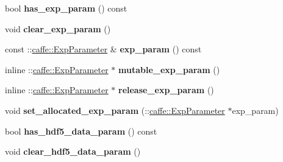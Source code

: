 \begin{DoxyCompactItemize}
\mbox{\label{classcaffe_1_1_v1_layer_parameter_a578cecc6ab3c9c779b070fd3b4bd4d47}} 
bool {\bfseries has\+\_\+exp\+\_\+param} () const
\item 
\mbox{\label{classcaffe_1_1_v1_layer_parameter_a50e536df42170253b5101efae046b4ea}} 
void {\bfseries clear\+\_\+exp\+\_\+param} ()
\item 
\mbox{\label{classcaffe_1_1_v1_layer_parameter_a88ff986d8dc315867eba82260f535112}} 
const \+::\mbox{\hyperlink{classcaffe_1_1_exp_parameter}{caffe\+::\+Exp\+Parameter}} \& {\bfseries exp\+\_\+param} () const
\item 
\mbox{\label{classcaffe_1_1_v1_layer_parameter_a2d54988cbb7a1fc351f5ce5f970fe0bb}} 
inline \+::\mbox{\hyperlink{classcaffe_1_1_exp_parameter}{caffe\+::\+Exp\+Parameter}} $\ast$ {\bfseries mutable\+\_\+exp\+\_\+param} ()
\item 
\mbox{\label{classcaffe_1_1_v1_layer_parameter_a6d368f68fdd78b6d7120eafa0b40583c}} 
inline \+::\mbox{\hyperlink{classcaffe_1_1_exp_parameter}{caffe\+::\+Exp\+Parameter}} $\ast$ {\bfseries release\+\_\+exp\+\_\+param} ()
\item 
\mbox{\label{classcaffe_1_1_v1_layer_parameter_a3ad5cc072e37a3c1e684590c9c67552a}} 
void {\bfseries set\+\_\+allocated\+\_\+exp\+\_\+param} (\+::\mbox{\hyperlink{classcaffe_1_1_exp_parameter}{caffe\+::\+Exp\+Parameter}} $\ast$exp\+\_\+param)
\item 
\mbox{\label{classcaffe_1_1_v1_layer_parameter_acf35946808d2930852d1a7b84c7a8b66}} 
bool {\bfseries has\+\_\+hdf5\+\_\+data\+\_\+param} () const
\item 
\mbox{\label{classcaffe_1_1_v1_layer_parameter_a6d21069448939d0a08e1ad40018447e1}} 
void {\bfseries clear\+\_\+hdf5\+\_\+data\+\_\+param} ()
\item 
\mbox{\label{classcaffe_1_1_v1_layer_parameter_a290ca86a41d5cca505bf039d58eefd6c}} 

\end{DoxyCompactItemize}
